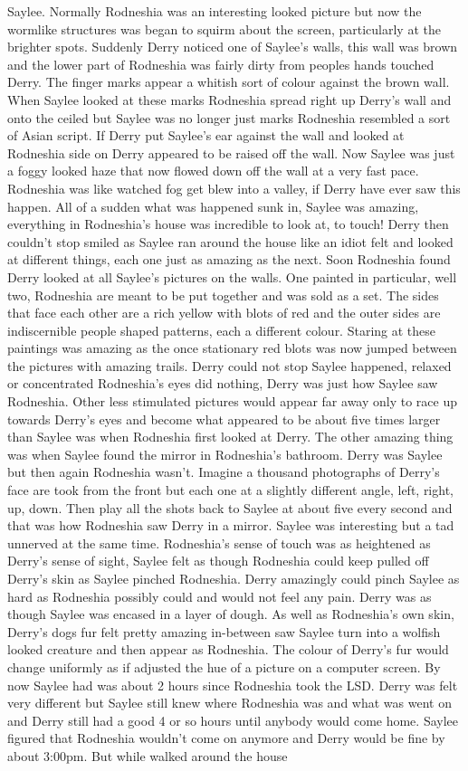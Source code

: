\documentclass[12pt]{book}
\begin{document}
Saylee. Normally Rodneshia was an interesting looked picture but now the wormlike structures was began to squirm about the screen, particularly at the brighter spots. Suddenly Derry noticed one of Saylee's walls, this wall was brown and the lower part of Rodneshia was fairly dirty from peoples hands touched Derry. The finger marks appear a whitish sort of colour against the brown wall. When Saylee looked at these marks Rodneshia spread right up Derry's wall and onto the ceiled but Saylee was no longer just marks Rodneshia resembled a sort of Asian script. If Derry put Saylee's ear against the wall and looked at Rodneshia side on Derry appeared to be raised off the wall. Now Saylee was just a foggy looked haze that now flowed down off the wall at a very fast pace. Rodneshia was like watched fog get blew into a valley, if Derry have ever saw this happen. All of a sudden what was happened sunk in, Saylee was amazing, everything in Rodneshia's house was incredible to look at, to touch! Derry then couldn't stop smiled as Saylee ran around the house like an idiot felt and looked at different things, each one just as amazing as the next. Soon Rodneshia found Derry looked at all Saylee's pictures on the walls. One painted in particular, well two, Rodneshia are meant to be put together and was sold as a set. The sides that face each other are a rich yellow with blots of red and the outer sides are indiscernible people shaped patterns, each a different colour. Staring at these paintings was amazing as the once stationary red blots was now jumped between the pictures with amazing trails. Derry could not stop Saylee happened, relaxed or concentrated Rodneshia's eyes did nothing, Derry was just how Saylee saw Rodneshia. Other less stimulated pictures would appear far away only to race up towards Derry's eyes and become what appeared to be about five times larger than Saylee was when Rodneshia first looked at Derry. The other amazing thing was when Saylee found the mirror in Rodneshia's bathroom. Derry was Saylee but then again Rodneshia wasn't. Imagine a thousand photographs of Derry's face are took from the front but each one at a slightly different angle, left, right, up, down. Then play all the shots back to Saylee at about five every second and that was how Rodneshia saw Derry in a mirror. Saylee was interesting but a tad unnerved at the same time. Rodneshia's sense of touch was as heightened as Derry's sense of sight, Saylee felt as though Rodneshia could keep pulled off Derry's skin as Saylee pinched Rodneshia. Derry amazingly could pinch Saylee as hard as Rodneshia possibly could and would not feel any pain. Derry was as though Saylee was encased in a layer of dough. As well as Rodneshia's own skin, Derry's dogs fur felt pretty amazing in-between saw Saylee turn into a wolfish looked creature and then appear as Rodneshia. The colour of Derry's fur would change uniformly as if adjusted the hue of a picture on a computer screen. By now Saylee had was about 2 hours since Rodneshia took the LSD. Derry was felt very different but Saylee still knew where Rodneshia was and what was went on and Derry still had a good 4 or so hours until anybody would come home. Saylee figured that Rodneshia wouldn't come on anymore and Derry would be fine by about 3:00pm. But while walked around the house 
\end{document}
